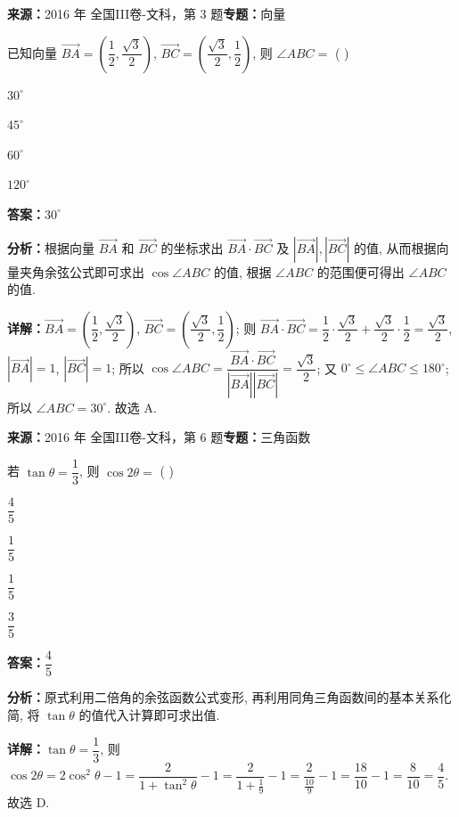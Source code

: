 \begin{question}[points=5]
\textbf{来源：}2016 年 全国III卷-文科，第 3 题\quad \textbf{专题：}向量\par
已知向量 $\overrightarrow{BA}=(\dfrac{1}{2},\dfrac{\sqrt{3}}{2})$, $\overrightarrow{BC}=(\dfrac{\sqrt{3}}{2},\dfrac{1}{2})$, 则 $\angle ABC=$ ( )
\begin{choices}
  \item $30^{\circ}$
  \item $45^{\circ}$
  \item $60^{\circ}$
  \item $120^{\circ}$
\end{choices}
\begin{solution}
\textbf{答案：}$30^{\circ}$

\textbf{分析：}根据向量 $\overrightarrow{BA}$ 和 $\overrightarrow{BC}$ 的坐标求出 $\overrightarrow{BA}\cdot\overrightarrow{BC}$ 及 $|\overrightarrow{BA}|,|\overrightarrow{BC}|$ 的值, 从而根据向量夹角余弦公式即可求出 $\cos\angle ABC$ 的值, 根据 $\angle ABC$ 的范围便可得出 $\angle ABC$ 的值.

\textbf{详解：}$\overrightarrow{BA}=(\dfrac{1}{2},\dfrac{\sqrt{3}}{2})$, $\overrightarrow{BC}=(\dfrac{\sqrt{3}}{2},\dfrac{1}{2})$; 则 $\overrightarrow{BA}\cdot\overrightarrow{BC}=\dfrac{1}{2}\cdot\dfrac{\sqrt{3}}{2}+\dfrac{\sqrt{3}}{2}\cdot\dfrac{1}{2}=\dfrac{\sqrt{3}}{2}$, $|\overrightarrow{BA}|=1$, $|\overrightarrow{BC}|=1$; 所以 $\cos\angle ABC=\dfrac{\overrightarrow{BA}\cdot\overrightarrow{BC}}{|\overrightarrow{BA}||\overrightarrow{BC}|}=\dfrac{\sqrt{3}}{2}$; 又 $0^{\circ}\le\angle ABC\le180^{\circ}$; 所以 $\angle ABC=30^{\circ}$. 故选 A.
\end{solution}
\end{question}

\begin{question}[points=5]
\textbf{来源：}2016 年 全国III卷-文科，第 6 题\quad \textbf{专题：}三角函数\par
若 $\tan\theta=\dfrac{1}{3}$, 则 $\cos2\theta=$ ( )
\begin{choices}
  \item $\dfrac{4}{5}$
  \item $\dfrac{1}{5}$
  \item $\dfrac{1}{5}$
  \item $\dfrac{3}{5}$
\end{choices}
\begin{solution}
\textbf{答案：}$\dfrac{4}{5}$

\textbf{分析：}原式利用二倍角的余弦函数公式变形, 再利用同角三角函数间的基本关系化简, 将 $\tan\theta$ 的值代入计算即可求出值.

\textbf{详解：}$\tan\theta=\dfrac{1}{3}$, 则 $\cos2\theta=2\cos^2\theta-1=\dfrac{2}{1+\tan^2\theta}-1=\dfrac{2}{1+\frac{1}{9}}-1=\dfrac{2}{\frac{10}{9}}-1=\dfrac{18}{10}-1=\dfrac{8}{10}=\dfrac{4}{5}$. 故选 D.
\end{solution}
\end{question}


